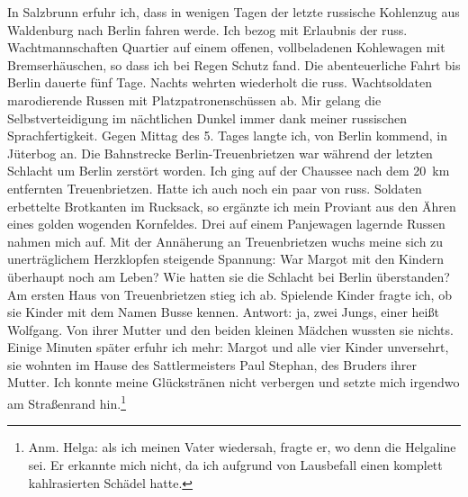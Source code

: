 In Salzbrunn erfuhr ich, dass in wenigen Tagen der letzte russische Kohlenzug aus Waldenburg nach Berlin fahren werde. Ich bezog mit Erlaubnis der russ. Wachtmannschaften Quartier auf einem offenen, vollbeladenen Kohlewagen mit Bremserhäuschen, so dass ich bei Regen Schutz fand. Die abenteuerliche Fahrt bis Berlin dauerte fünf Tage. Nachts wehrten wiederholt die russ. Wachtsoldaten marodierende Russen mit Platzpatronenschüssen ab. Mir gelang die Selbstverteidigung im nächtlichen Dunkel immer dank meiner russischen Sprachfertigkeit. Gegen Mittag des 5. Tages langte ich, von Berlin  kommend, in Jüterbog an. Die Bahnstrecke Berlin-Treuenbrietzen war während der letzten Schlacht um Berlin zerstört worden. Ich ging auf der Chaussee nach dem 20~km entfernten Treuenbrietzen. Hatte ich auch noch ein paar von russ. Soldaten erbettelte Brotkanten im Rucksack, so ergänzte ich mein Proviant aus den Ähren eines golden wogenden Kornfeldes. Drei auf einem Panjewagen lagernde Russen nahmen mich auf. Mit der Annäherung an Treuenbrietzen wuchs meine sich zu unerträglichem Herzklopfen steigende Spannung: War Margot mit den Kindern überhaupt noch am Leben? Wie hatten sie die Schlacht bei Berlin überstanden? Am ersten Haus von Treuenbrietzen stieg ich ab. Spielende Kinder fragte ich, ob sie Kinder mit dem Namen Busse kennen. Antwort: ja, zwei Jungs, einer heißt Wolfgang. Von ihrer Mutter und den beiden kleinen Mädchen wussten sie nichts. Einige Minuten später erfuhr ich mehr: Margot und alle vier Kinder unversehrt, sie wohnten im Hause des Sattlermeisters Paul Stephan, des Bruders ihrer Mutter. Ich konnte meine Glückstränen nicht verbergen und setzte mich irgendwo am Straßenrand hin.\footnote{Anm. Helga: als ich meinen Vater wiedersah, fragte er, wo denn die Helgaline sei. Er erkannte mich nicht, da ich aufgrund von Lausbefall einen komplett kahlrasierten Schädel hatte.}

